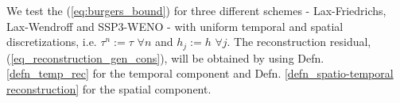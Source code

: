 \documentclass[final]{amsart}
\numberwithin{equation}{section}
\begin{document}

We test the  (\ref{eq:burgers_bound}) for three different schemes
- Lax-Friedrichs, Lax-Wendroff and SSP3-WENO - with uniform temporal
and spatial discretizations, i.e. $\tau^n:=\tau $ $\forall n$ and
$h_j:=h$ $\forall j$.  The reconstruction residual,
(\ref{eq_reconstruction_gen_cons}), will be obtained by using
Defn. \ref{defn_temp_rec} for the temporal component and
Defn. \ref{defn_spatio-temporal reconstruction} for the spatial
component.

\end{document}
